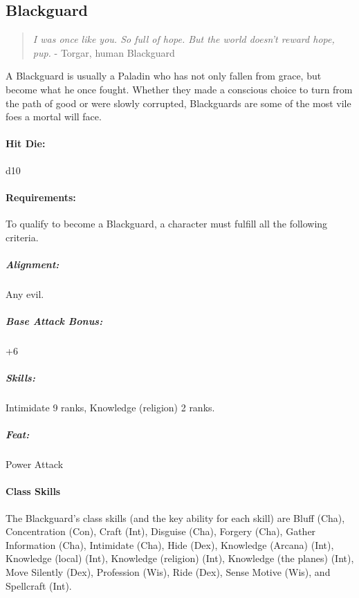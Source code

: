 \subsection{Blackguard}
\label{sec:Blackguard}
\begin{quote}
\emph{I was once like you. So full of hope. But the world doesn't reward hope, pup.}
- Torgar, human Blackguard
\end{quote}
A Blackguard is usually a Paladin who has not only fallen from grace, but become what he once fought. Whether they made a conscious choice to turn from the path of good or were slowly corrupted, Blackguards are some of the most vile foes a mortal will face.
\paragraph{Hit Die:} d10
\paragraph{Requirements:}
To qualify to become a Blackguard, a character must fulfill all the following criteria.
\subparagraph{Alignment:} Any evil.
\subparagraph{Base Attack Bonus:} +6
\subparagraph{Skills:} Intimidate 9 ranks, Knowledge (religion) 2 ranks.
\subparagraph{Feat:} Power Attack
\paragraph{Class Skills}
The Blackguard's class skills (and the key ability for each skill) are Bluff (Cha), Concentration (Con), Craft (Int), Disguise (Cha), Forgery (Cha), Gather Information (Cha), Intimidate (Cha), Hide (Dex), Knowledge (Arcana) (Int), Knowledge (local) (Int), Knowledge (religion) (Int), Knowledge (the planes) (Int), Move Silently (Dex), Profession (Wis), Ride (Dex), Sense Motive (Wis), and Spellcraft (Int).

